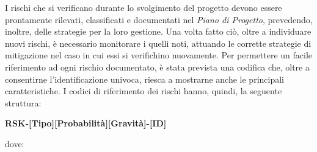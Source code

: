 			I rischi che si verificano durante lo svolgimento del progetto devono essere prontamente rilevati, classificati e documentati nel \textit{Piano di Progetto}, prevedendo, inoltre, delle strategie per la loro gestione. Una volta fatto ciò, oltre a individuare nuovi rischi, è necessario monitorare i quelli noti, attuando le corrette strategie di mitigazione nel caso in cui essi si verifichino nuovamente.
			\newline
			Per permettere un facile riferimento ad ogni rischio documentato, è stata prevista una codifica che, oltre a consentirne l'identificazione univoca, riesca a mostrarne anche le principali caratteristiche. I codici di riferimento dei rischi hanno, quindi, la seguente struttura:
			\begin{center}
				\textbf{RSK-[Tipo][Probabilità][Gravità]-[ID]}
			\end{center}
			dove:

